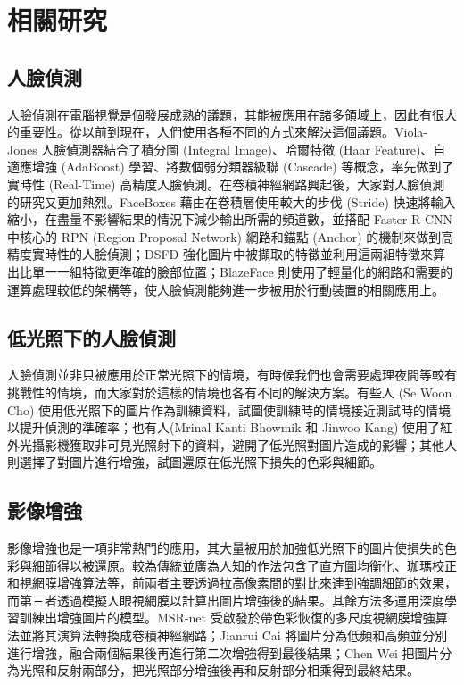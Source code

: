 \chapter{相關研究}
\label{c:related}

\section{人臉偵測}
\cite{Rowe:2005:ASR}人臉偵測在電腦視覺是個發展成熟的議題，其能被應用在諸多領域上，因此有很大的重要性。從以前到現在，人們使用各種不同的方式來解決這個議題。Viola-Jones 人臉偵測器結合了積分圖 (Integral Image)、哈爾特徵 (Haar Feature)、自適應增強 (AdaBoost) 學習、將數個弱分類器級聯 (Cascade) 等概念，率先做到了實時性 (Real-Time) 高精度人臉偵測。在卷積神經網路興起後，大家對人臉偵測的研究又更加熱烈。FaceBoxes 藉由在卷積層使用較大的步伐 (Stride) 快速將輸入縮小，在盡量不影響結果的情況下減少輸出所需的頻道數，並搭配 Faster R-CNN 中核心的 RPN (Region Proposal Network) 網路和錨點 (Anchor) 的機制來做到高精度實時性的人臉偵測；DSFD 強化圖片中被擷取的特徵並利用這兩組特徵來算出比單一一組特徵更準確的臉部位置；BlazeFace 則使用了輕量化的網路和需要的運算處理較低的架構等，使人臉偵測能夠進一步被用於行動裝置的相關應用上。

\section{低光照下的人臉偵測}
人臉偵測並非只被應用於正常光照下的情境，有時候我們也會需要處理夜間等較有挑戰性的情境，而大家對於這樣的情境也各有不同的解決方案。有些人 (Se Woon Cho) 使用低光照下的圖片作為訓練資料，試圖使訓練時的情境接近測試時的情境以提升偵測的準確率；也有人(Mrinal Kanti Bhowmik 和 Jinwoo Kang) 使用了紅外光攝影機獲取非可見光照射下的資料，避開了低光照對圖片造成的影響；其他人則選擇了對圖片進行增強，試圖還原在低光照下損失的色彩與細節。

\section{影像增強}
影像增強也是一項非常熱門的應用，其大量被用於加強低光照下的圖片使損失的色彩與細節得以被還原。較為傳統並廣為人知的作法包含了直方圖均衡化、珈瑪校正和視網膜增強算法等，前兩者主要透過拉高像素間的對比來達到強調細節的效果，而第三者透過模擬人眼視網膜以計算出圖片增強後的結果。其餘方法多運用深度學習訓練出增強圖片的模型。MSR-net 受啟發於帶色彩恢復的多尺度視網膜增強算法並將其演算法轉換成卷積神經網路；Jianrui Cai 將圖片分為低頻和高頻並分別進行增強，融合兩個結果後再進行第二次增強得到最後結果；Chen Wei 把圖片分為光照和反射兩部分，把光照部分增強後再和反射部分相乘得到最終結果。
